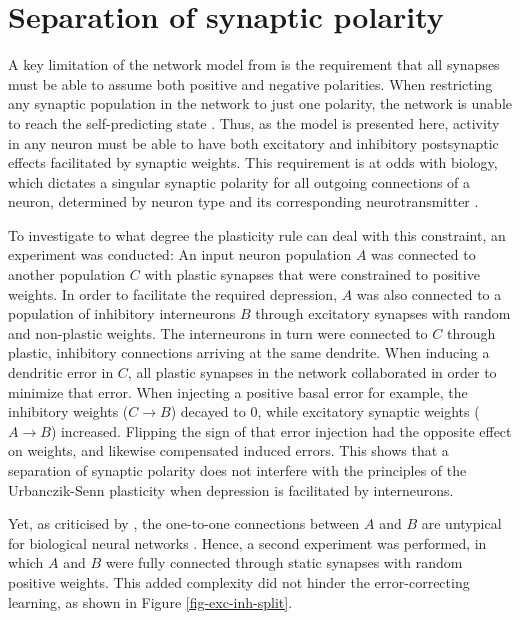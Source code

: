 \section{Separation of synaptic polarity}

A key limitation of the network model from \cite{sacramento2018dendritic} is the requirement that all synapses must be
able to assume both positive and negative polarities. When restricting any synaptic population in the network to just
one polarity, the network is unable to reach the self-predicting state . Thus, as the model is presented
here, activity in any neuron must be able to have both excitatory and inhibitory postsynaptic effects facilitated by
synaptic weights. This requirement is at odds with biology, which dictates a singular synaptic polarity for all outgoing
connections of a neuron, determined by neuron type and its corresponding neurotransmitter \citeme.


To investigate to what degree the plasticity rule can deal with this constraint, an experiment was conducted: An input
neuron population $A$  was connected to another population $C$ with plastic synapses that were constrained to positive
weights. In order to facilitate the required depression, $A$ was also connected to a population of inhibitory
interneurons $B$ through excitatory synapses with random and non-plastic weights. The interneurons in turn were
connected to $C$ through plastic, inhibitory connections arriving at the same dendrite. When inducing a dendritic error
in $C$, all plastic synapses in the network collaborated in order to minimize that error. When injecting a positive
basal error for example, the inhibitory weights ($C \rightarrow B$) decayed to 0, while excitatory synaptic weights ($A
\rightarrow B$) increased. Flipping the sign of that error injection had the opposite effect on weights, and likewise
compensated induced errors. This shows that a separation of synaptic polarity does not interfere with the principles of
the Urbanczik-Senn plasticity when depression is facilitated by interneurons.

Yet, as criticised by \citeme, the one-to-one connections between $A$ and $B$ are untypical for biological neural
networks \citeme. Hence, a second experiment was performed, in which $A$ and $B$ were fully connected through static
synapses with random positive weights. This added complexity did not hinder the error-correcting learning, as shown in
Figure \ref{fig-exc-inh-split}.


